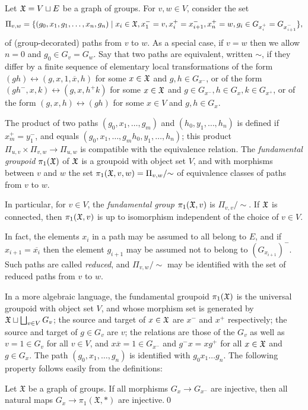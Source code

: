 \documentclass{amsart}
\begin{document}
Let ${\mathfrak X}=V\sqcup E$ be a graph of groups. For $v,w\in V$, consider the
set
\begin{equation}\label{eq:gog_elements}
  \Pi_{v,w}=\{(g_0,x_1,g_1,\dots,x_n,g_n)\mid
x_i\in{\mathfrak X},x_1^-=v,x_i^+=x_{i+1}^-,x_n^+=w,g_i\in G_{x_i^+}=G_{x_{i+1}^-}\},
\end{equation}
of (group-decorated) paths from $v$ to $w$. As a special case, if $v=w$
then we allow $n=0$ and $g_0\in G_v=G_w$. Say that two paths are
equivalent, written $\sim$, if they differ by a finite sequence of
elementary local transformations of the form
$(g h)\leftrightarrow(g,x,1,\overline x,h)$ for some $x\in{\mathfrak X}$ and $g,h\in
G_{x^-}$, or of the form $(g h^-,x,k)\leftrightarrow(g,x,h^+k)$ for some
$x\in{\mathfrak X}$ and $g\in G_{x^-},h\in G_x,k\in G_{x^+}$, or of the form
$(g,x,h)\leftrightarrow(g h)$ for some $x\in V$ and $g,h\in G_x$.

The product of two paths $(g_0,x_1,\dots,g_m)$ and
$(h_0,y_1,\dots,h_n)$ is defined if $x_m^+=y_1^-$, and equals
$(g_0,x_1,\dots,g_m h_0,y_1,\dots,h_n)$; this product
$\Pi_{u,v}\times\Pi_{v,w}\to\Pi_{u,w}$ is compatible with the
equivalence relation. The \emph{fundamental groupoid} $\pi_1({\mathfrak X})$ of
${\mathfrak X}$ is a groupoid with object set $V$, and with morphisms between
$v$ and $w$ the set $\pi_1({\mathfrak X},v,w)=\Pi_{v,w}/{\sim}$ of equivalence
classes of paths from $v$ to $w$.

In particular, for $v\in V$, the \emph{fundamental group} $\pi_1({\mathfrak X},v)$ is
$\Pi_{v,v}/{\sim}$. If ${\mathfrak X}$ is connected, then $\pi_1({\mathfrak X},v)$ is up to
isomorphism independent of the choice of $v\in V$.

In fact, the elements $x_i$ in a path may be assumed to all belong to
$E$, and if $x_{i+1}=\overline{x_i}$ then the element $g_{i+1}$ may be
assumed not to belong to $(G_{x_{i+1}})^-$. Such paths are called
\emph{reduced}, and $\Pi_{v,w}/{\sim}$ may be identified with the set
of reduced paths from $v$ to $w$.

In a more algebraic language, the fundamental groupoid $\pi_1({\mathfrak X})$ is the
universal groupoid with object set $V$, and whose morphism set is generated
by ${\mathfrak X}\sqcup\bigsqcup_{v\in V}G_v$; the source and target of $x\in{\mathfrak X}$ are
$x^-$ and $x^+$ respectively; the source and target of $g\in G_v$ are $v$;
the relations are those of the $G_v$ as well as $v=1\in G_v$ for all $v\in
V$, and $x\overline x=1\in G_{x^-}$ and $g^-x=x g^+$ for all $x\in{\mathfrak X}$ and
$g\in G_x$.  The path $(g_0,x_1,\dots,g_n)$ is identified with $g_0x_1\dots
g_n$. The following property follows easily from the definitions:
\begin{lem}\label{lem:InjGraphGroups}
   Let $\mathfrak X$ be a graph of groups. If all morphisms $G_x\to
   G_{x^-}$ are injective, then all natural maps
   $G_x\to\pi_1(\mathfrak X,*)$ are injective.\qed
\end{lem}
\end{document}

